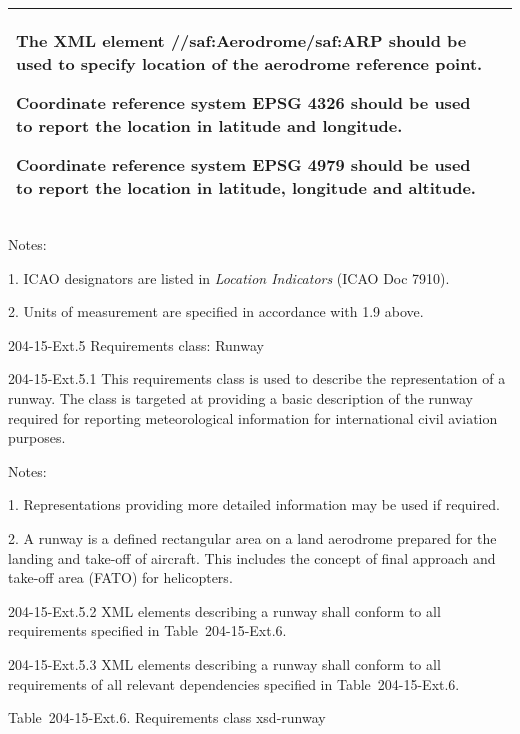 \begin{longtable}[]{@{}ll@{}}
\begin{minipage}[t]{0.47\columnwidth}
The XML element //saf:Aerodrome/saf:ARP should be used to specify location of the aerodrome reference point.

Coordinate reference system EPSG 4326 should be used to report the location in latitude and longitude.

Coordinate reference system EPSG 4979 should be used to report the location in latitude, longitude and altitude.\strut
\end{minipage}\tabularnewline
\bottomrule
\end{longtable}

Notes:

1. ICAO designators are listed in \emph{Location Indicators} (ICAO Doc 7910).

2. Units of measurement are specified in accordance with 1.9 above.

204-15-Ext.5 Requirements class: Runway

204-15-Ext.5.1 This requirements class is used to describe the representation of a runway. The class is targeted at providing a basic description of the runway required for reporting meteorological information for international civil aviation purposes.

Notes:

1. Representations providing more detailed information may be used if required.

2. A runway is a defined rectangular area on a land aerodrome prepared for the landing and take-off of aircraft. This includes the concept of final approach and take-off area (FATO) for helicopters.

204-15-Ext.5.2 XML elements describing a runway shall conform to all requirements specified in Table~204-15-Ext.6.

204-15-Ext.5.3 XML elements describing a runway shall conform to all requirements of all relevant dependencies specified in Table~204-15-Ext.6.

Table~204-15-Ext.6. Requirements class xsd-runway

